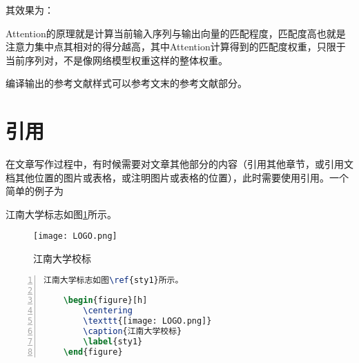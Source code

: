 其效果为：

\noindent Attention的原理就是计算当前输入序列与输出向量的匹配程度，匹配度高也就是注意力集中点其相对的得分越高，其中Attention计算得到的匹配度权重，只限于当前序列对，不是像网络模型权重这样的整体权重\cite{vaswani2017attention}。

编译输出的参考文献样式可以参考文末的参考文献部分。

\section{引用}

在文章写作过程中，有时候需要对文章其他部分的内容（引用其他章节，或引用文档其他位置的图片或表格，或注明图片或表格的位置），此时需要使用引用。一个简单的例子为

江南大学标志如图\ref{sty1}所示。

\begin{figure}[h]
    \centering
    \texttt{[image: LOGO.png]}
    \caption{江南大学校标}
    \label{sty1}
\end{figure}

\begin{lstlisting}[language=tex, breaklines=true, basicstyle=\ttfamily, numbers=left, numberstyle=\tiny, frame=shadowbox]
    江南大学标志如图\ref{sty1}所示。

    \begin{figure}[h]
        \centering
        \texttt{[image: LOGO.png]}
        \caption{江南大学校标}
        \label{sty1}
    \end{figure}    
\end{lstlisting}